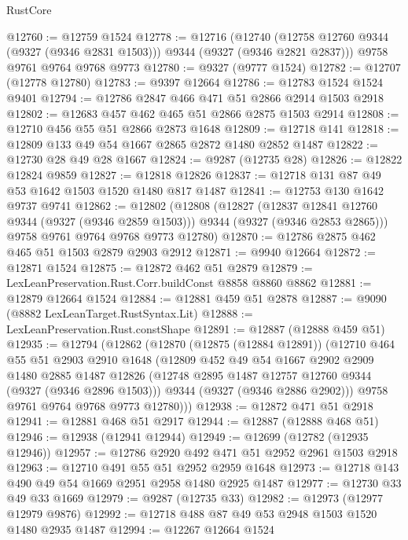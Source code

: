\begin{lexlean}{RustCore}
\begin{coremodule}
@12760 := @12759 @1524
@12778 := @12716
    (@12740 (@12758 @12760 @9344 (@9327 (@9346 @2831 @1503))) @9344 (@9327 (@9346 @2821 @2837)))
    @9758
    @9761
    @9764
    @9768
    @9773
@12780 := @9327 (@9777 @1524)
@12782 := @12707 (@12778 @12780)
@12783 := @9397 @12664
@12786 := @12783 @1524 @1524 @9401
@12794 := @12786 @2847 @466 @471 @51 @2866 @2914 @1503 @2918
@12802 := @12683 @457 @462 @465 @51 @2866 @2875 @1503 @2914
@12808 := @12710 @456 @55 @51 @2866 @2873 @1648
@12809 := @12718 @141
@12818 := @12809 @133 @49 @54 @1667 @2865 @2872 @1480 @2852 @1487
@12822 := @12730 @28 @49 @28 @1667
@12824 := @9287 (@12735 @28)
@12826 := @12822 @12824 @9859
@12827 := @12818 @12826
@12837 := @12718 @131 @87 @49 @53 @1642 @1503 @1520 @1480 @817 @1487
@12841 := @12753 @130 @1642 @9737 @9741
@12862 := @12802
    (@12808
      (@12827
        (@12837 @12841 @12760 @9344 (@9327 (@9346 @2859 @1503)))
        @9344
        (@9327 (@9346 @2853 @2865)))
      @9758
      @9761
      @9764
      @9768
      @9773
      @12780)
@12870 := @12786 @2875 @462 @465 @51 @1503 @2879 @2903 @2912
@12871 := @9940 @12664
@12872 := @12871 @1524
@12875 := @12872 @462 @51 @2879
@12879 := LexLeanPreservation.Rust.Corr.buildConst @8858 @8860 @8862
@12881 := @12879 @12664 @1524
@12884 := @12881 @459 @51 @2878
@12887 := @9090 (@8882 LexLeanTarget.RustSyntax.Lit)
@12888 := LexLeanPreservation.Rust.constShape
@12891 := @12887 (@12888 @459 @51)
@12935 := @12794
    (@12862
      (@12870
        (@12875 (@12884 @12891))
        (@12710
          @464
          @55
          @51
          @2903
          @2910
          @1648
          (@12809
            @452
            @49
            @54
            @1667
            @2902
            @2909
            @1480
            @2885
            @1487
            @12826
            (@12748 @2895 @1487 @12757 @12760 @9344 (@9327 (@9346 @2896 @1503)))
            @9344
            (@9327 (@9346 @2886 @2902)))
          @9758
          @9761
          @9764
          @9768
          @9773
          @12780)))
@12938 := @12872 @471 @51 @2918
@12941 := @12881 @468 @51 @2917
@12944 := @12887 (@12888 @468 @51)
@12946 := @12938 (@12941 @12944)
@12949 := @12699 (@12782 (@12935 @12946))
@12957 := @12786 @2920 @492 @471 @51 @2952 @2961 @1503 @2918
@12963 := @12710 @491 @55 @51 @2952 @2959 @1648
@12973 := @12718 @143 @490 @49 @54 @1669 @2951 @2958 @1480 @2925 @1487
@12977 := @12730 @33 @49 @33 @1669
@12979 := @9287 (@12735 @33)
@12982 := @12973 (@12977 @12979 @9876)
@12992 := @12718 @488 @87 @49 @53 @2948 @1503 @1520 @1480 @2935 @1487
@12994 := @12267 @12664 @1524

\end{coremodule}
\end{lexlean}
